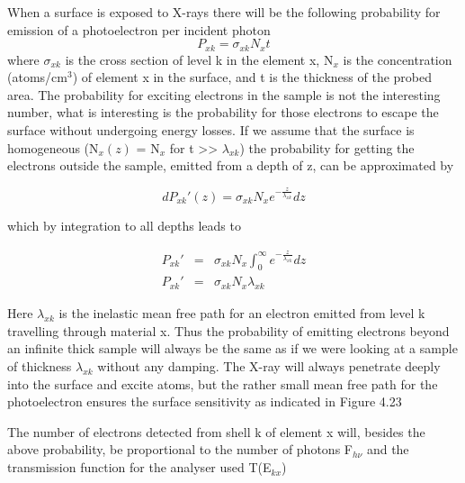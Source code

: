           When a surface  is  exposed  to  X-rays  there  will  be  the
          following probability for emission of a photoelectron  per
          incident photon
          \begin{equation}
          P_{xk} = \sigma_{xk}N_{x}t
          \end{equation}
          where $\sigma_{xk}$ is the cross section of level k  in  the
          element x, N$_{x}$ is the concentration (atoms/cm$^{3}$)  of
          element x in the surface, and t  is  the  thickness  of  the
          probed area. The probability for exciting electrons in the
          sample is not the interesting number, what is interesting
          is the probability for those electrons to escape the surface
          without undergoing energy losses. If we assume that the
          surface is homogeneous (N$_{x}(z)$ = N$_{x}$ for t >>
          $\lambda_{xk}$) the probability for getting the electrons
          outside the sample, emitted from a depth of z, can be
          approximated by

         \begin{equation}
          dP_{xk}'(z) = \sigma_{xk}N_{x}e^{-\frac{z}{\lambda_{xk}}}dz
          \end{equation}

             which by integration to all depths leads  to

         \begin{eqnarray}
          P_{xk}'   &   =   &   \sigma_{xk}N_{x}    \int_{0}^{\infty}
          e^{-\frac{z}{\lambda_{xk}}}dz\\
                   P_{xk}'     &     = &
          \sigma_{xk}N_{x}\lambda_{xk}
           \end{eqnarray}

             Here $\lambda_{xk}$ is the inelastic mean free path for
          an electron emitted from level k travelling through material
          x. Thus the probability of emitting electrons beyond an
          infinite thick sample will always be the same as if we were
          looking at a sample of thickness $\lambda_{xk}$ without any
          damping. The X-ray will always penetrate deeply into the
          surface and excite atoms, but the rather small mean free
          path for the photoelectron ensures the surface sensitivity
          as indicated in Figure 4.23


          The number of electrons detected from  shell  k  of  element
          x will, besides the above probability, be proportional to  the
          number of photons F$_{h\nu}$ and the  transmission  function
          for the analyser used T(E$_{kx}$)

